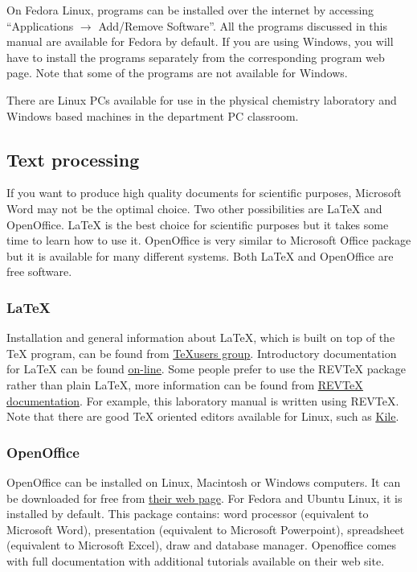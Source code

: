 \documentclass[byrevtex,amssymb,aps,pra,floatfix,letterpaper]{revtex4}
\begin{document}
On Fedora Linux, programs can be installed over the internet by accessing ``Applications $\rightarrow$ Add/Remove Software''. All the programs discussed in this manual are available for Fedora by default. If you are using Windows, you will have to install the programs separately from the corresponding program web page. Note that some of the programs are not available for Windows.

There are Linux PCs available for use in the physical chemistry laboratory and Windows based machines in the department PC classroom.

\subsection{Text processing}

If you want to produce high quality documents for scientific purposes, Microsoft Word may not be the optimal choice. Two other possibilities are \LaTeX{} and OpenOffice. \LaTeX{} is the best choice for scientific purposes but it takes some time to learn how to use it. OpenOffice is very similar to Microsoft Office package but it is available for many different systems. Both \LaTeX{} and OpenOffice are free software.

\subsubsection{\LaTeX}

Installation and general information about \LaTeX{}, which is built on top of the \TeX{} program, can be found from \href{http://www.tug.org/}{\underline{\TeX users group}}. Introductory documentation for \LaTeX{} can be found \href{http://www.ctan.org/tex-archive/info/lshort/english/lshort.pdf}{\underline{on-line}}. Some people prefer to use the REV\TeX{} package rather than plain \LaTeX{}, more information can be found from \href{http://authors.aps.org/revtex4/}{\underline{REV\TeX{} documentation}}. For example, this laboratory manual is written using REV\TeX{}. Note that there are good \TeX{} oriented editors available for Linux, such as \href{http://kile.sourceforge.net/}{\underline{Kile}}.

\subsubsection{OpenOffice}

OpenOffice can be installed on Linux, Macintosh or Windows computers. It can be downloaded for free from \href{http://www.openoffice.org/}{\underline{their web page}}. For Fedora and Ubuntu Linux, it is installed by default.
This package contains: word processor (equivalent to Microsoft Word), presentation (equivalent to Microsoft Powerpoint), spreadsheet (equivalent to Microsoft Excel), draw and database manager. Openoffice comes with full documentation with additional tutorials available on their web site.
\end{document}
